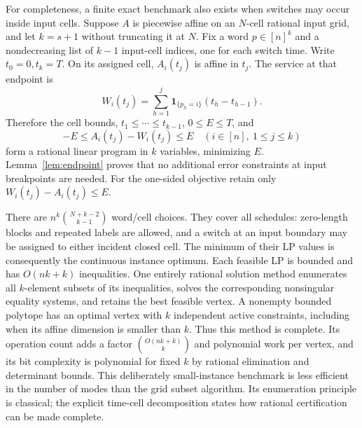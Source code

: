 For completeness, a finite exact benchmark also exists when switches may
occur inside input cells. Suppose $A$ is piecewise affine on an $N$-cell
rational input grid, and let $k=s+1$ without truncating it at $N$. Fix a word
$p\in[n]^k$ and a nondecreasing list of $k-1$ input-cell indices, one for
each switch time. Write $t_0=0,t_k=T$. On its assigned cell,
$A_i(t_j)$ is affine in $t_j$. The service at that endpoint is
\[
 W_i(t_j)=\sum_{h=1}^j\mathbf1_{\{p_h=i\}}(t_h-t_{h-1}).
\]
Therefore the cell bounds, $t_1\le\cdots\le t_{k-1}$, $0\le E\le T$,
and
\begin{equation}\label{eq:continuous-cell-LP}
 -E\le A_i(t_j)-W_i(t_j)\le E
 \quad(i\in[n],\ 1\le j\le k)
\end{equation}
form a rational linear program in $k$ variables, minimizing $E$.
Lemma~\ref{lem:endpoint} proves that no additional error constraints at
input breakpoints are needed. For the one-sided objective retain only
$W_i(t_j)-A_i(t_j)\le E$.

There are $n^k\binom{N+k-2}{k-1}$ word/cell choices. They cover all schedules:
zero-length blocks and repeated labels are allowed, and a switch at an input
boundary may be assigned to either incident closed cell. The minimum of
their LP values is consequently the continuous instance optimum. Each
feasible LP is bounded and has $O(nk+k)$ inequalities. One entirely rational
solution method enumerates all $k$-element subsets of its inequalities,
solves the corresponding nonsingular equality systems, and retains the best
feasible vertex. A nonempty bounded polytope has an optimal vertex with
$k$ independent active constraints, including when its affine dimension is
smaller than $k$. Thus this method is complete. Its operation count adds a
factor $\binom{O(nk+k)}{k}$ and polynomial work per vertex, and its bit
complexity is polynomial for fixed $k$ by rational elimination and determinant
bounds. This deliberately small-instance benchmark is less efficient in
the number of modes than the grid subset algorithm. Its enumeration principle
is classical; the explicit time-cell decomposition states how rational
certification can be made complete.
